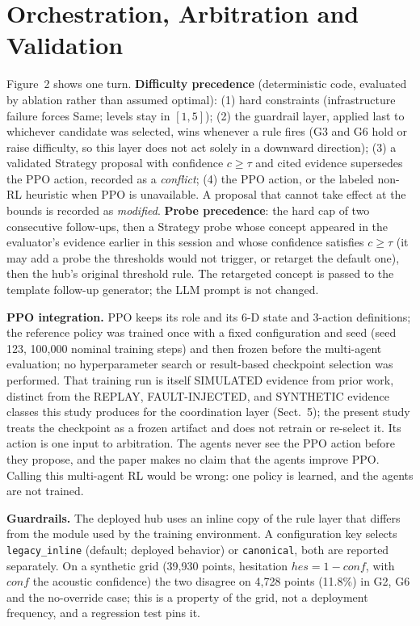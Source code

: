 \documentclass[runningheads]{llncs}
\begin{document}
\section{Orchestration, Arbitration and Validation}

Figure~2 shows one turn. \textbf{Difficulty precedence} (deterministic code, evaluated by ablation rather than assumed optimal): (1) hard constraints (infrastructure failure forces Same; levels stay in $[1,5]$); (2) the guardrail layer, applied last to whichever candidate was selected, wins whenever a rule fires (G3 and G6 hold or raise difficulty, so this layer does not act solely in a downward direction); (3) a validated Strategy proposal with confidence $c \geq \tau$ and cited evidence supersedes the PPO action, recorded as a \emph{conflict}; (4) the PPO action, or the labeled non-RL heuristic when PPO is unavailable. A proposal that cannot take effect at the bounds is recorded as \emph{modified}. \textbf{Probe precedence}: the hard cap of two consecutive follow-ups, then a Strategy probe whose concept appeared in the evaluator's evidence earlier in this session and whose confidence satisfies $c \geq \tau$ (it may add a probe the thresholds would not trigger, or retarget the default one), then the hub's original threshold rule. The retargeted concept is passed to the template follow-up generator; the LLM prompt is not changed.

\textbf{PPO integration.} PPO keeps its role and its 6-D state and 3-action definitions; the reference policy was trained once with a fixed configuration and seed (seed 123, 100,000 nominal training steps) and then frozen before the multi-agent evaluation; no hyperparameter search or result-based checkpoint selection was performed. That training run is itself SIMULATED evidence from prior work, distinct from the REPLAY, FAULT-INJECTED, and SYNTHETIC evidence classes this study produces for the coordination layer (Sect.~5); the present study treats the checkpoint as a frozen artifact and does not retrain or re-select it. Its action is one input to arbitration. The agents never see the PPO action before they propose, and the paper makes no claim that the agents improve PPO. Calling this multi-agent RL would be wrong: one policy is learned, and the agents are not trained.

\textbf{Guardrails.} The deployed hub uses an inline copy of the rule layer that differs from the module used by the training environment. A configuration key selects \texttt{legacy\_inline} (default; deployed behavior) or \texttt{canonical}, both are reported separately. On a synthetic grid (39,930 points, hesitation $hes = 1-conf$, with $conf$ the acoustic confidence) the two disagree on 4,728 points (11.8\%) in G2, G6 and the no-override case; this is a property of the grid, not a deployment frequency, and a regression test pins it.
\end{document}
